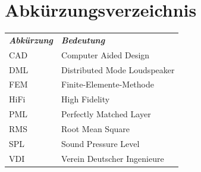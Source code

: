 \clearpage
\section*{Abk\"urzungsverzeichnis}


\begin{table}[!h]
\setlength{\tabcolsep}{50pt}
	\centering
		\begin{tabular}[t]{l l}
\bfseries \emph{Abk\"urzung}& \bfseries \emph{Bedeutung}\\
		CAD	& Computer Aided Design\\
		DML	& Distributed Mode Loudspeaker\\
		FEM	& Finite-Elemente-Methode\\
		HiFi	& High Fidelity\\
		PML	& Perfectly Matched Layer\\
		RMS	& Root Mean Square\\
		SPL	& Sound Pressure Level\\
		VDI	& Verein Deutscher Ingenieure\\

		\end{tabular}

\end{table}
\normalsize
\normalfont
